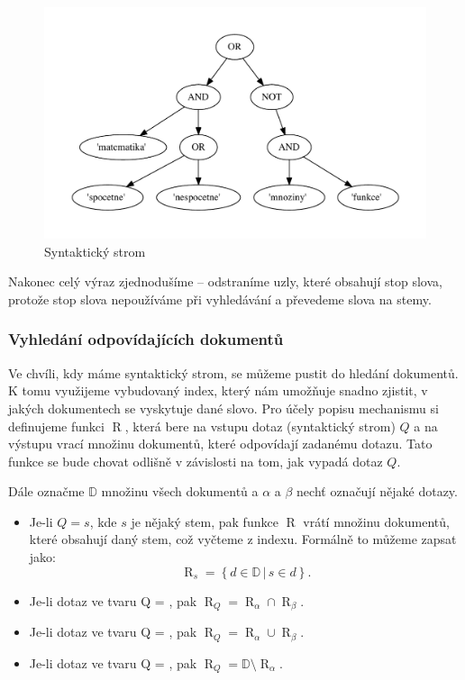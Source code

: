\documentclass[12pt]{article}
\newcommand{\sep}{\,|\,}
\newcommand{\sssection}[1]{\subsubsection{#1}}
\DeclareMathOperator{\getdocs}{R}
\newcommand{\alldoc}{\mathbb{D}}
\begin{document}
\begin{figure}
  \centering
  \includegraphics[width=14cm]{obrazky/syntactic_tree.pdf}
  \caption{Syntaktický strom}
  \label{fig:syntree}
\end{figure}

Nakonec celý výraz zjednodušíme -- odstraníme uzly, které obsahují stop slova, protože stop slova nepoužíváme při vyhledávání a převedeme slova na stemy. 

\sssection{Vyhledání odpovídajících dokumentů}

Ve chvíli, kdy máme syntaktický strom, se můžeme pustit do hledání dokumentů. K tomu využijeme vybudovaný index, který nám umožňuje snadno zjistit, v jakých dokumentech se vyskytuje dané slovo. Pro účely popisu mechanismu si definujeme funkci $\getdocs$, která bere na vstupu dotaz (syntaktický strom) $Q$ a na výstupu vrací množinu dokumentů, které odpovídají zadanému dotazu. Tato funkce se bude chovat odlišně v závislosti na tom, jak vypadá dotaz $Q$. 

Dále označme $\alldoc$ množinu všech dokumentů a $\alpha$ a $\beta$ nechť označují nějaké dotazy. 

\begin{itemize}
\item Je-li $Q=s$, kde $s$ je nějaký stem, pak funkce $\getdocs$ vrátí množinu dokumentů, které obsahují daný stem, což vyčteme z indexu. Formálně to můžeme zapsat jako:
$$
\getdocs_s = \left\{d\in \alldoc\sep s\in d\right\}.
$$
\item Je-li dotaz ve tvaru Q = , pak $\getdocs_Q = \getdocs_\alpha \cap \getdocs_\beta$.
\item Je-li dotaz ve tvaru Q = , pak $\getdocs_Q = \getdocs_\alpha \cup \getdocs_\beta$.
\item Je-li dotaz ve tvaru Q = , pak $\getdocs_Q = \alldoc\setminus\getdocs_\alpha$.
\end{itemize}
\end{document}
